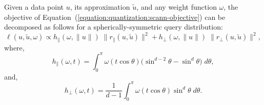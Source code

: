 \begin{theorem}
    \label{theorem:quantization:scann:decomposition}
    Given a data point $u$, its approximation $\tilde{u}$, and any weight function $\omega$,
    the objective of Equation~(\ref{equation:quantization:scann-objective}) can be decomposed as follows
    for a spherically-symmetric query distribution:
    \begin{equation*}
        \ell(u, \tilde{u}, \omega) \propto h_\parallel(\omega, \lVert u \rVert) \; \lVert r_\parallel(u, \tilde{u}) \rVert^2 +
        h_\perp(\omega, \lVert u \rVert) \; \lVert r_\perp(u, \tilde{u}) \rVert^2,
    \end{equation*}
    where,
    \begin{equation*}
        h_\parallel(\omega, t) = \int_0^\pi \omega(t \cos \theta) \Big( \sin^{d-2}\theta - \sin^d \theta \Big) \; d\theta,
    \end{equation*}
    and,
    \begin{equation*}
        h_\perp(\omega, t) = \frac{1}{d-1} \int_0^\pi \omega(t \cos \theta) \sin^d \theta \; d\theta.
    \end{equation*}
\end{theorem}

